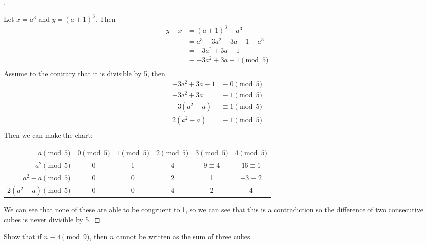 \documentclass[11pt]{article}
\newenvironment{myproof}[1][\proofname]{%
  \begin{proof}[#1]$ $\par\nobreak\ignorespaces
}{%
  \end{proof}
}
\newenvironment{problem}[2][Problem]{\begin{trivlist}
\item[\hskip \labelsep {\bfseries #1}\hskip \labelsep {\bfseries #2.}]}{\end{trivlist}}
\begin{document}
\begin{myproof}
    Let $x=a^3$ and $y=(a+1)^3$. Then
    \begin{align*}
        y - x & = (a+1)^3 - a^3                \\
              & = a^3 - 3a^2 + 3a -1 -a^3      \\
              & = - 3a^2 + 3a -1               \\
              & \equiv - 3a^2 + 3a -1 \pmod{5} \\
    \end{align*}
    Assume to the contrary that it is divisible by 5, then
    \begin{align*}
        -3a^2 + 3a -1 & \equiv 0   \pmod{5} \\
        -3a^2 + 3a    & \equiv 1   \pmod{5} \\
        -3(a^2 -a)    & \equiv 1   \pmod{5} \\
        2(a^2 -a)     & \equiv 1   \pmod{5} \\
    \end{align*}
    Then we can make the chart:

    \setlength{\tabcolsep}{3pt}
    \begin{center}
        \begin{tabular}{r||c|c|c|c|c}
            $a     \pmod{5}$    & $0\pmod{5}$ & $1\pmod{5}$ & $2\pmod{5}$ & $3\pmod{5}$  & $4\pmod{5}$    \\
            $a^2  \pmod{5}$     & 0           & 1           & 4           & $9 \equiv 4$ & $16 \equiv 1 $ \\
            $a^2-a \pmod{5}$    & 0           & 0           & 2           & 1            & $-3 \equiv 2 $ \\
            $2(a^2-a) \pmod{5}$ & 0           & 0           & 4           & 2            & 4              \\
        \end{tabular}
    \end{center}
    We can see that none of these are able to be congruent to 1, so we can see that this is a contradiction so the difference of two consecutive cubes is never divisible by 5.

\end{myproof}


\begin{problem}{19}
Show that if $n\equiv 4\pmod{9}$, then $n$ cannot be written as the sum of three cubes.
\end{problem}
\end{document}
